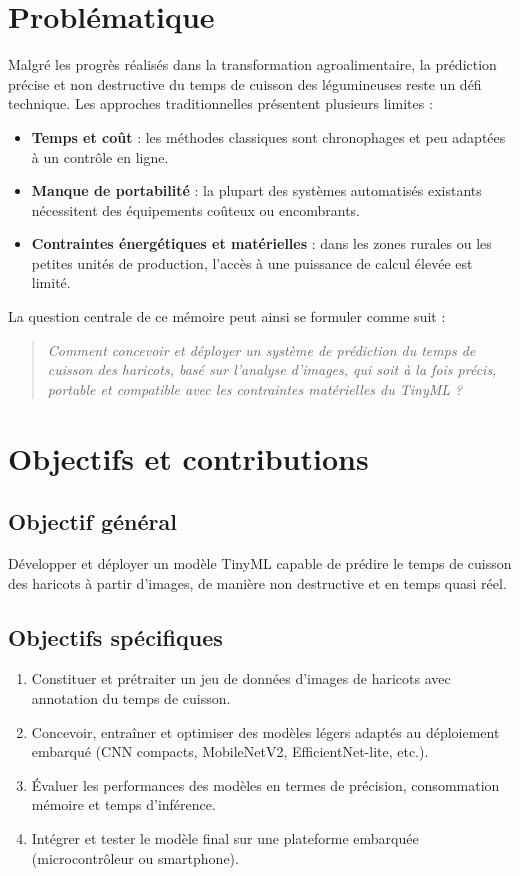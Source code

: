 \section{Problématique}
Malgré les progrès réalisés dans la transformation agroalimentaire, la prédiction précise et non destructive du temps de cuisson des légumineuses reste un défi technique. Les approches traditionnelles présentent plusieurs limites :
\begin{itemize}
	\item \textbf{Temps et coût} : les méthodes classiques sont chronophages et peu adaptées à un contrôle en ligne.
	\item \textbf{Manque de portabilité} : la plupart des systèmes automatisés existants nécessitent des équipements coûteux ou encombrants.
	\item \textbf{Contraintes énergétiques et matérielles} : dans les zones rurales ou les petites unités de production, l’accès à une puissance de calcul élevée est limité.
\end{itemize}

La question centrale de ce mémoire peut ainsi se formuler comme suit :
\begin{quote}
	\textit{Comment concevoir et déployer un système de prédiction du temps de cuisson des haricots, basé sur l’analyse d’images, qui soit à la fois précis, portable et compatible avec les contraintes matérielles du TinyML ?}
\end{quote}

\section{Objectifs et contributions}

\subsection{Objectif général}
Développer et déployer un modèle TinyML capable de prédire le temps de cuisson des haricots à partir d’images, de manière non destructive et en temps quasi réel.

\subsection{Objectifs spécifiques}
\begin{enumerate}
	\item Constituer et prétraiter un jeu de données d’images de haricots avec annotation du temps de cuisson.
	\item Concevoir, entraîner et optimiser des modèles légers adaptés au déploiement embarqué (CNN compacts, MobileNetV2, EfficientNet-lite, etc.).
	\item Évaluer les performances des modèles en termes de précision, consommation mémoire et temps d’inférence.
	\item Intégrer et tester le modèle final sur une plateforme embarquée (microcontrôleur ou smartphone).
\end{enumerate}

